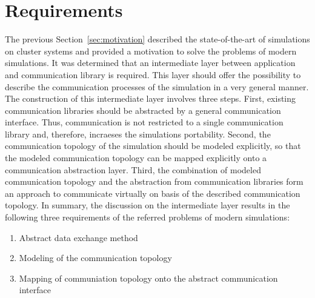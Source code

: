 

\section{Requirements}
\label{sec:requirements}

The previous Section~\ref{sec:motivation} described the state-of-the-art
of simulations on cluster systems and provided a motivation to solve
the problems of modern simulations.
It was determined that an intermediate layer between application and
communication library is required.  This layer should offer the
possibility to describe the communication processes of the simulation
in a very general manner.  The construction of this intermediate layer
involves three steps.  First, existing communication libraries should
be abstracted by a general communication interface. Thus,
communication is not restricted to a single communication library and,
therefore, incraeses the simulations portability.  Second, the
communication topology of the simulation should be modeled explicitly,
so that the modeled communication topology can be mapped explicitly
onto a communication abstraction layer.  Third, the combination of
modeled communication topology and the abstraction from communication
libraries form an approach to communicate virtually on basis of the
described communication topology.  In summary, the discussion on the
intermediate layer results in the following three requirements of the
referred problems of modern simulations:

\begin{enumerate}
\item Abstract data exchange method
\item Modeling of the communication topology
\item Mapping of communiation topology onto the abstract communication interface
\end{enumerate}



